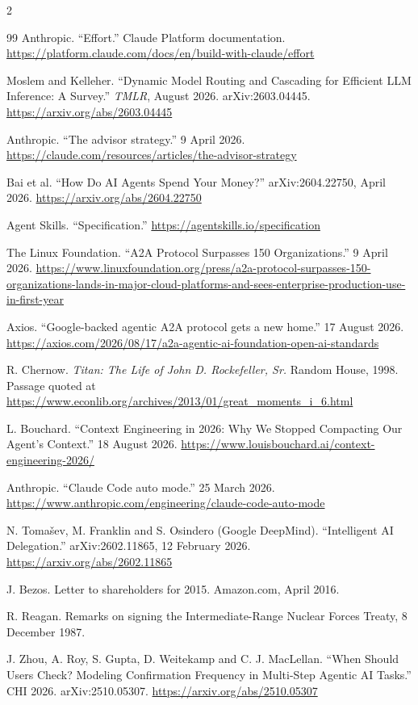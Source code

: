 \documentclass[11pt,letterpaper]{article}
\begin{document}
\begin{multicols}{2}
{\begin{thebibliography}{99}
 Anthropic. ``Effort.'' Claude Platform documentation.
\url{https://platform.claude.com/docs/en/build-with-claude/effort}

 Moslem and Kelleher. ``Dynamic Model Routing and Cascading for Efficient
LLM Inference: A Survey.'' \emph{TMLR}, August 2026. arXiv:2603.04445.
\url{https://arxiv.org/abs/2603.04445}

 Anthropic. ``The advisor strategy.'' 9 April 2026.
\url{https://claude.com/resources/articles/the-advisor-strategy}

 Bai et al. ``How Do AI Agents Spend Your Money?'' arXiv:2604.22750,
April 2026.
\url{https://arxiv.org/abs/2604.22750}

 Agent Skills. ``Specification.''
\url{https://agentskills.io/specification}

 The Linux Foundation. ``A2A Protocol Surpasses 150 Organizations.''
9 April 2026.
\url{https://www.linuxfoundation.org/press/a2a-protocol-surpasses-150-organizations-lands-in-major-cloud-platforms-and-sees-enterprise-production-use-in-first-year}

 Axios. ``Google-backed agentic A2A protocol gets a new home.''
17 August 2026.
\url{https://axios.com/2026/08/17/a2a-agentic-ai-foundation-open-ai-standards}

 R. Chernow. \emph{Titan: The Life of John D. Rockefeller, Sr.} Random
House, 1998. Passage quoted at
\url{https://www.econlib.org/archives/2013/01/great_moments_i_6.html}

 L. Bouchard. ``Context Engineering in 2026: Why We Stopped Compacting
Our Agent's Context.'' 18 August 2026.
\url{https://www.louisbouchard.ai/context-engineering-2026/}

 Anthropic. ``Claude Code auto mode.'' 25 March 2026.
\url{https://www.anthropic.com/engineering/claude-code-auto-mode}

 N. Tomašev, M. Franklin and S. Osindero (Google DeepMind).
``Intelligent AI Delegation.'' arXiv:2602.11865, 12 February 2026.
\url{https://arxiv.org/abs/2602.11865}

 J. Bezos. Letter to shareholders for 2015. Amazon.com, April 2016.

 R. Reagan. Remarks on signing the Intermediate-Range Nuclear Forces Treaty,
8 December 1987.

 J. Zhou, A. Roy, S. Gupta, D. Weitekamp and C. J. MacLellan. ``When Should
Users Check? Modeling Confirmation Frequency in Multi-Step Agentic AI Tasks.'' CHI 2026.
arXiv:2510.05307.
\url{https://arxiv.org/abs/2510.05307}


\end{thebibliography}}
\end{multicols}
\end{document}
